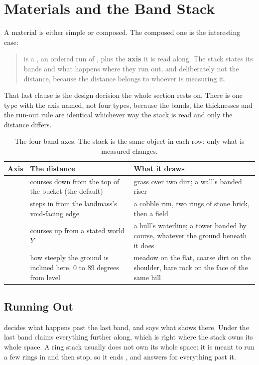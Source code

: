 \section{Materials and the Band Stack}

A material is either simple or composed. The composed one is the interesting case:

\begin{quote}
 is a , an ordered run of , plus the \textbf{axis} it is read along. The stack states its bands
and what happens where they run out, and deliberately not the distance, because
the distance belongs to whoever is measuring it.
\end{quote}

That last clause is the design decision the whole section rests on. There is one
type with the axis named, not four types, because the bands, the thicknesses and
the run-out rule are identical whichever way the stack is read and only the
distance differs.

\begin{table}[htbp]
\caption{The four band axes. The stack is the same object in each row; only what
is measured changes.}
\label{tab:axes}
\small
\begin{tabularx}{\textwidth}{L{2.0cm} L{4.2cm} Y}
\toprule
\textbf{Axis} & \textbf{The distance} & \textbf{What it draws} \\
\midrule
{} & courses down from the top of the bucket (the default) &
  grass over two dirt; a wall's banded riser \\
 & steps in from the landmass's void-facing edge &
  a cobble rim, two rings of stone brick, then a field \\
 & courses up from a stated world $Y$ &
  a hull's waterline; a tower banded by course, whatever the ground beneath it
  does \\
 & how steeply the ground is inclined here, 0 to 89 degrees from level &
  meadow on the flat, coarse dirt on the shoulder, bare rock on the face of the
  same hill \\
\bottomrule
\end{tabularx}
\end{table}

\subsection{Running Out}

 decides what happens past the last band, and  says what
shows there. Under  the last band claims everything further along, which
is right where the stack owns its whole space. A ring stack usually does not own
its whole space: it is meant to run a few rings in and then stop, so it ends
, and  answers for everything past it.

